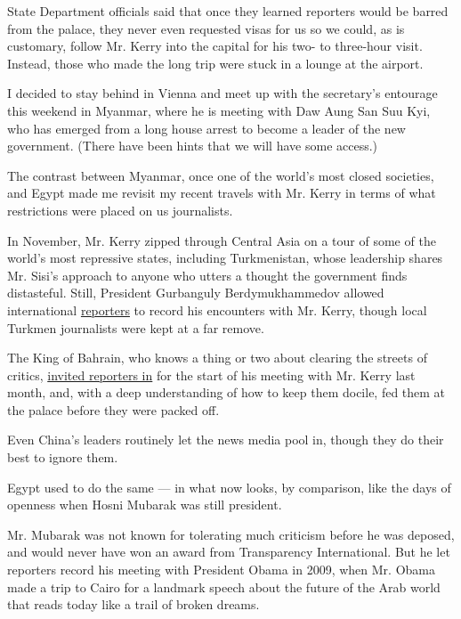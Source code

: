 State Department officials said that once they learned reporters would
be barred from the palace, they never even requested visas for us so we
could, as is customary, follow Mr. Kerry into the capital for his two-
to three-hour visit. Instead, those who made the long trip were stuck in
a lounge at the airport.

I decided to stay behind in Vienna and meet up with the secretary's
entourage this weekend in Myanmar, where he is meeting with Daw Aung San
Suu Kyi, who has emerged from a long house arrest to become a leader of
the new government. (There have been hints that we will have some
access.)

The contrast between Myanmar, once one of the world's most closed
societies, and Egypt made me revisit my recent travels with Mr. Kerry in
terms of what restrictions were placed on us journalists.

In November, Mr. Kerry zipped through Central Asia on a tour of some of
the world's most repressive states, including Turkmenistan, whose
leadership shares Mr. Sisi's approach to anyone who utters a thought the
government finds distasteful. Still, President Gurbanguly
Berdymukhammedov allowed international
\href{http://www.nytimes.com/2015/11/04/world/asia/john-kerry-confronts-human-rights-as-he-zips-through-central-asia.html?_r=0}{reporters}
to record his encounters with Mr. Kerry, though local Turkmen
journalists were kept at a far remove.

The King of Bahrain, who knows a thing or two about clearing the streets
of critics,
\href{http://www.nytimes.com/2016/04/08/world/middleeast/year-after-iran-nuclear-deal-kerry-confronts-concerns-of-arab-states.html}{invited
reporters in} for the start of his meeting with Mr. Kerry last month,
and, with a deep understanding of how to keep them docile, fed them at
the palace before they were packed off.

Even China's leaders routinely let the news media pool in, though they
do their best to ignore them.

Egypt used to do the same --- in what now looks, by comparison, like the
days of openness when Hosni Mubarak was still president.

Mr. Mubarak was not known for tolerating much criticism before he was
deposed, and would never have won an award from Transparency
International. But he let reporters record his meeting with President
Obama in 2009, when Mr. Obama made a trip to Cairo for a landmark speech
about the future of the Arab world that reads today like a trail of
broken dreams.

